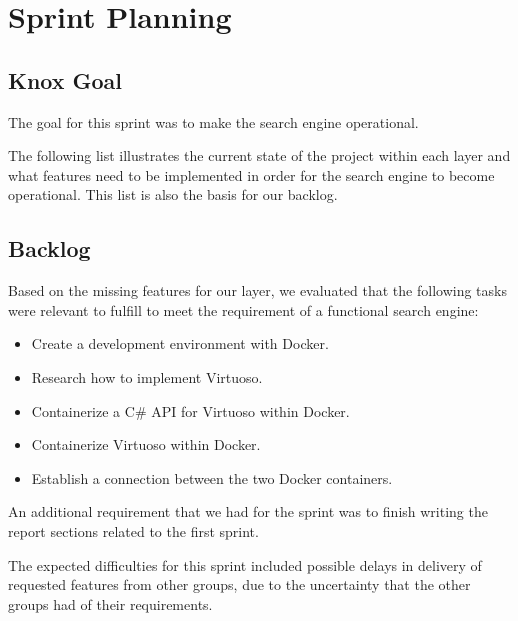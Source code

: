 
\section{Sprint Planning}
\subsection*{Knox Goal}
The goal for this sprint was to make the search engine operational.

The following list illustrates the current state of the \knox{} project within each layer and what features need to be implemented in order for the search engine to become operational. This list is also the basis for our backlog.



\subsection*{Backlog}
Based on the missing features for our layer, we evaluated that the following tasks were relevant to fulfill to meet the requirement of a functional search engine:
\begin{itemize}
    \item Create a development environment with Docker.
    \item Research how to implement Virtuoso.
    \item Containerize a C\# API for Virtuoso within Docker.
    \item Containerize Virtuoso within Docker.
    \item Establish a connection between the two Docker containers.
\end{itemize}

An additional requirement that we had for the sprint was to finish writing the report sections related to the first \knox{} sprint.

The expected difficulties for this sprint included possible delays in delivery of requested features from other groups, due to the uncertainty that the other groups had of their requirements. 

